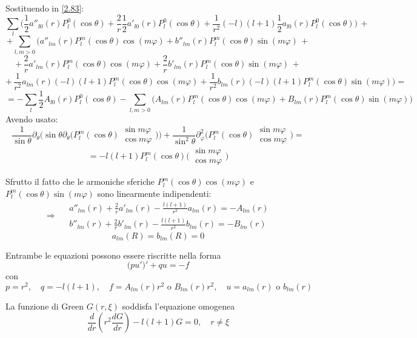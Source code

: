\documentclass[a4paper,11pt]{report}
\begin{document}
\smallskip

Sostituendo in \eqref{2.83}:
\[
\sum_l \Big(\frac{1}{2}a''_{l0}(r)P_l^0(\cos\theta) + \frac{2}{r}\frac{1}{2}a'_{l0}(r)P_l^0(\cos\theta) + \frac{1}{r^2}(-l)(l+1)\frac{1}{2} a_{l0}(r) P_l^0(\cos\theta) \Big) \,+
\]
\[
+\sum_{l,m>0} \Big( a''_{lm}(r)P_l^m(\cos\theta)\cos (m\varphi) + b''_{lm}(r)P_l^m(\cos\theta)\sin (m\varphi) \,+
\]
\[
+\, \frac{2}{r} a'_{lm}(r) P_l^m (\cos\theta)\cos (m\varphi) + \frac{2}{r}b'_{lm}(r)P_l^m(\cos\theta) \sin (m\varphi) \,+
\]
\[
+\, \frac{1}{r^2}a_{lm}(r)(-l)(l+1)P_l^m(\cos\theta)\cos (m\varphi) + \frac{1}{r^2} b_{lm}(r)(-l)(l+1)P_l^m(\cos\theta)\sin (m\varphi) \Big)=
\]
\[
=-\sum_l \frac{1}{2}A_{l0}(r)P_l^0(\cos\theta) - \sum_{l,m>0}\big(A_{lm}(r) P_l^m(\cos\theta)\cos (m \varphi) + B_{lm}(r)P_l^m(\cos\theta)\sin (m\varphi) \big)
\]
Avendo usato:
\[
\frac{1}{\sin\theta}\partial_\theta \Big(\sin \theta\partial_\theta \Big(P_l^m(\cos\theta) \begin{matrix}\sin m \varphi\\ \cos m \varphi \end{matrix} \Big) \Big)+\frac{1}{\sin^2\theta} \partial^2_\varphi \Big(P_l^m(\cos\theta)\begin{matrix}\sin m \varphi\\ \cos m \varphi \end{matrix} \Big)=
\]
\[
=-l(l+1)P_l^m(\cos\theta)\Big( \begin{matrix}\sin m \varphi\\ \cos m \varphi \end{matrix} \Big)
\]

Sfrutto il fatto che le armoniche sferiche $P_l^m(\cos\theta)\cos (m\varphi)$ e $P_l^m(\cos\theta)\sin (m\varphi)$ sono linearmente indipendenti:
\begin{equation} \Rightarrow \quad
\begin{gathered}
a''_{lm}(r) +\frac{2}{r}a'_{lm}(r) - \frac{l(l+1)}{r^2}a_{lm}(r)=-A_{lm}(r)\\
 b''_{lm}(r) +\frac{2}{r}b'_{lm}(r) - \frac{l(l+1)}{r^2}b_{lm}(r)=-B_{lm}(r)
\end{gathered}
\end{equation}
\[
a_{lm}(R)=b_{lm}(R)=0
\]

Entrambe le equazioni possono essere riscritte nella forma
\[
\big(pu'\big)' + qu=-f
\]
con
\[
p=r^2, \quad q=-l(l+1), \quad f=A_{lm}(r)r^2 \text{ o }B_{lm}(r)r^2, \quad u=a_{lm}(r)\text{ o }b_{lm}(r)
\]

La funzione di Green $G(r,\xi)$ soddisfa l'equazione omogenea 
\[
\frac{d}{dr}\left(r^2\frac{dG}{dr}\right)-l(l+1)G=0, \quad r\neq\xi
\]
\end{document}
